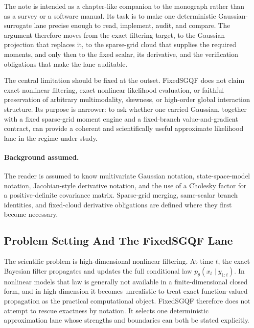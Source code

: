 \documentclass[11pt]{article}
\numberwithin{equation}{section}
\begin{document}
The note is intended as a chapter-like companion to the monograph rather than as
a survey or a software manual.  Its task is to make one deterministic
Gaussian-surrogate lane precise enough to read, implement, audit, and compare.
The argument therefore moves from the exact filtering target, to the Gaussian
projection that replaces it, to the sparse-grid cloud that supplies the required
moments, and only then to the fixed scalar, its derivative, and the verification
obligations that make the lane auditable.

The central limitation should be fixed at the outset.  FixedSGQF does not claim
exact nonlinear filtering, exact nonlinear likelihood evaluation, or faithful
preservation of arbitrary multimodality, skewness, or high-order global
interaction structure.  Its purpose is narrower: to ask whether one carried
Gaussian, together with a fixed sparse-grid moment engine and a fixed-branch
value-and-gradient contract, can provide a coherent and scientifically useful
approximate likelihood lane in the regime under study.

\paragraph{Background assumed.}
The reader is assumed to know multivariate Gaussian notation, state-space-model
notation, Jacobian-style derivative notation, and the use of a Cholesky factor
for a positive-definite covariance matrix.  Sparse-grid merging, same-scalar
branch identities, and fixed-cloud derivative obligations are defined where they
first become necessary.

\tableofcontents

\subsection{Problem Setting And The FixedSGQF Lane}
\label{sec:p32-problem-lane}

The scientific problem is high-dimensional nonlinear filtering.  At time
\(t\), the exact Bayesian filter propagates and updates the full conditional law
\(p_\theta(x_t\mid y_{1:t})\).  In nonlinear models that law is generally not
available in a finite-dimensional closed form, and in high dimension it becomes
unrealistic to treat exact function-valued propagation as the practical
computational object.  FixedSGQF therefore does not attempt to rescue exactness
by notation.  It selects one deterministic approximation lane whose strengths and
boundaries can both be stated explicitly.
\end{document}
